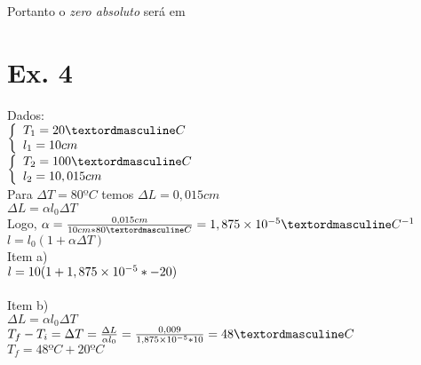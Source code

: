 Portanto o \textit{zero absoluto} será em \\

\section{Ex. 4}

Dados: \\
$ \left\{
	  \begin{array}{l l}
		  T_{1} = 20ºC \\
		  l_{1}=10cm \\
	  \end{array}
  \right.
$ \\
$ \left\{
  	\begin{array}{l l}
		  T_{2} = 100ºC \\
		  l_{2}=10,015cm \\
	  \end{array}
  \right.
$ \\

Para $\Delta T=80ºC$ temos $\Delta L=0,015cm$\\
$\Delta L = \alpha l_{0}\Delta T$\\
Logo, $\alpha = \frac{0,015cm}{10cm*80ºC} = 1,875\e{-5}ºC^{-1}$\\
$ l = l_{0}(1 + \alpha\Delta T)$\\
Item a)\\
$l = 10(1+1,875\times 10^{-5}*-20)$\\
\\
Item b)\\
$\Delta L = \alpha l_{0}\Delta T$\\
$T_{f} - T_{i} = \Delta T = \frac{\Delta L}{\alpha l_{0}} = \frac{0,009}{1,875\e{-5}*10} = 48ºC$\\
$T_{f} = 48ºC + 20ºC$\\
\\


